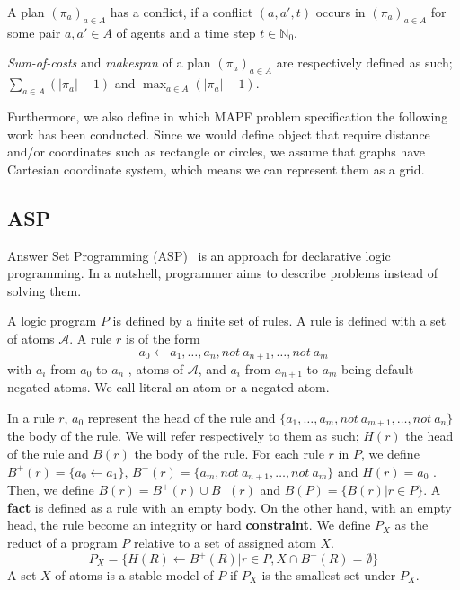 A plan $(\pi_a)_{a\in A}$ has a conflict, if a conflict $(a, a',t)$ occurs in $(\pi_a)_{a\in A}$ for some pair $a,a'\in A$ of agents and a time step $t\in\mathbb{N}_0$.

\textit{Sum-of-costs} and \textit{makespan} of a plan $(\pi_a)_{a\in A}$ are respectively defined as such; $\sum_{a\in A} (|\pi_a| - 1)$ and $\max_{a\in A} (|\pi_a| - 1)$.


Furthermore, we also define in which MAPF problem specification the following work has been conducted. Since we would define object that require distance and/or coordinates such as rectangle or circles, we assume that graphs have Cartesian coordinate system, which means we can represent them as a grid. 

\subsection{ASP}

Answer Set Programming (ASP)~\cite{ankolisc05a} is an approach for declarative logic programming. In a nutshell, programmer aims to describe problems instead of solving them.

A logic program \(P\) is defined by a finite set of rules. A rule is defined with a set of atoms \(\mathcal{A}\). A rule \(r\) is of the form 
\[
    a_0 \leftarrow a_1, \dots, a_n,not~a_{n+1}, \dots,not~a_m     
\] 
with \(a_i\) from \(a_0\) to \(a_n\) , atoms of \(\mathcal{A}\), and \(a_i\) from \(a_{n+1}\) to \(a_{m}\)  being default negated atoms. We call literal an atom or a negated atom.

In a rule \(r\), \(a_0\) represent the head of the rule and \(\{a_1, \dots, a_m,not~a_{m+1}, \dots,not~a_n\}\) the body of the rule. We will refer respectively to them as such; \(H(r)\) the head of the rule and \(B(r)\) the body of the rule. For each rule \(r\) in \(P\), we define \(B^+(r) =\{ a_0 \leftarrow a_1\}\), \(B^-(r) =\{ a_m,not~a_{n+1}, \dots,not~a_m \}\) and \(H(r) = a_0\) . Then, we define \(B(r) = B^+(r) \cup B^-(r) \) and \(B(P) = \{B(r) |r \in P\}\).
A \textbf{fact} is defined as a rule with an empty body. On the other hand, with an empty head, the rule become an integrity or hard \textbf{constraint}.
We define \(P_X\) as the reduct of a program \(P\) relative to a set of assigned atom \(X\).
\[
    P_X = \{H(R) \leftarrow B^+(R) | r \in P, X \cap B^-(R) = \emptyset\}
\]
A set \(X\) of atoms is a stable model of \(P\) if \(P_X\) is the smallest set under \(P_X\).



